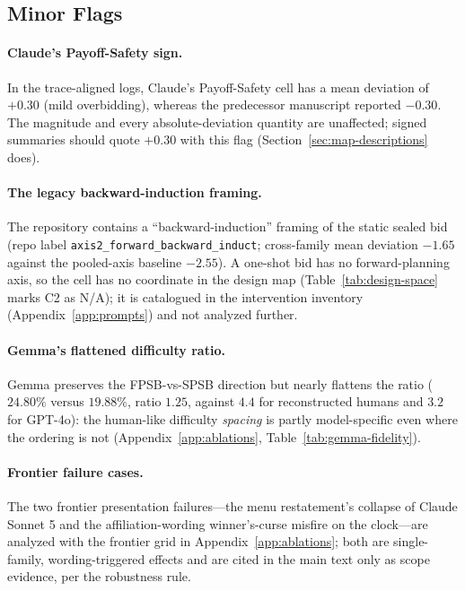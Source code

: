 \subsection{Minor Flags}\label{app:heterogeneity-minor}

\paragraph{Claude's Payoff-Safety sign.}
In the trace-aligned logs, Claude's Payoff-Safety cell has a mean deviation of $+0.30$ (mild overbidding), whereas the predecessor manuscript reported $-0.30$. The magnitude and every absolute-deviation quantity are unaffected; signed summaries should quote $+0.30$ with this flag (Section~\ref{sec:map-descriptions} does).

\paragraph{The legacy backward-induction framing.}
The repository contains a ``backward-induction'' framing of the static sealed bid (repo label \texttt{axis2\_forward\_backward\_induct}; cross-family mean deviation $-1.65$ against the pooled-axis baseline $-2.55$). A one-shot bid has no forward-planning axis, so the cell has no coordinate in the design map (Table~\ref{tab:design-space} marks C2 as N/A); it is catalogued in the intervention inventory (Appendix~\ref{app:prompts}) and not analyzed further.

\paragraph{Gemma's flattened difficulty ratio.}
Gemma preserves the FPSB-vs-SPSB direction but nearly flattens the ratio ($24.80\%$ versus $19.88\%$, ratio $1.25$, against $4.4$ for reconstructed humans and $3.2$ for GPT-4o): the human-like difficulty \emph{spacing} is partly model-specific even where the ordering is not (Appendix~\ref{app:ablations}, Table~\ref{tab:gemma-fidelity}).

\paragraph{Frontier failure cases.}
The two frontier presentation failures---the menu restatement's collapse of Claude Sonnet 5 and the affiliation-wording winner's-curse misfire on the clock---are analyzed with the frontier grid in Appendix~\ref{app:ablations}; both are single-family, wording-triggered effects and are cited in the main text only as scope evidence, per the robustness rule.

